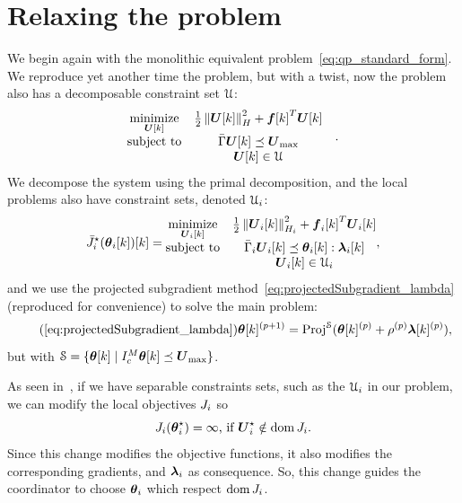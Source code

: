 \documentclass[../main.tex]{subfiles}
\begin{document}
\section{Relaxing the problem}\label{sec:not-so-scarce}
We begin again with the monolithic \mpc{} equivalent problem~\eqref{eq:qp_standard_form}.
We reproduce yet another time the problem, but with a twist, now the problem also has a decomposable constraint set $\mathcal{U}$:
\begin{equation}
  \label{eq:qp_standard_form_again_set_constraint}
  \begin{aligned}
    \begin{matrix}
      \mathop{\textrm{minimize}}\limits_{\boldsymbol{U}[k]} &
                                      \frac{1}{2}\left\lVert\boldsymbol{U}[k]\right\rVert^{2}_{H} + {\boldsymbol{f}[k]}^{T}\boldsymbol{U}[k] &\\
      \mathrm{subject~ to} & \bar{\Gamma}\boldsymbol{U}[k]\preceq {\boldsymbol{U}}_{\text{max}} \\
                                    & \boldsymbol{U}[k]\in \mathcal{U}
    \end{matrix}
  \end{aligned}.
\end{equation}
We decompose the system using the primal decomposition, and the local problems also have constraint sets, denoted $\mathcal{U}_{i}$:
\begin{equation}
  \label{eq:DOP_local_set_constraint}
  \eqoptobji(\thetaik)[k]=
  \begin{matrix}
    \minimize\limits_{\vec{U}_{i}[k]}&\frac{1}{2}\norm{\vec{U}_{i}[k]}^{2}_{H_{i}} + {\vec{f}_{i}[k]}^{T}\vec{U}_{i}[k]\\
    \mathrm{subject~ to} & \bar{\Gamma}_{i}\vec{U}_{i}[k] \preceq \thetaik:\lambdaik\\
                                     & \vec{U}_{i}[k]\in \set{U}_{i}
  \end{matrix},
\end{equation}
and we use the projected subgradient method~\eqref{eq:projectedSubgradient_lambda} (reproduced for convenience) to solve the main problem:
\begin{equation}
  \label{eq:projectedSubgradient_lambda_reprise}
  \tag{\ref*{eq:projectedSubgradient_lambda}}
  \vec{\theta}[k]\pplusone=\Proj^{\set{S}}(\vec{\theta}[k]\p+\rho\p\vec{\lambda}[k]\p),
\end{equation}
but with ${\mathcal{S} = \{\boldsymbol{\theta}[k]\mid I_{c}^{M}\boldsymbol{\theta}[k]\preceq \boldsymbol{U}_{\max}\}}$.
\begin{remark}
  As seen in~\cite{BoydEtAl2015}, if we have separable constraints sets, such as the $\mathcal{U}_{i}$ in our problem, we can modify the local objectives $J_{i}$ so \begin{equation*}
    J_{i}(\boldsymbol{\theta}_i^{\star})=\infty\text{, if }\boldsymbol{U}_{i}^{\star}\notin\operatorname{dom}{J_{i}}.
  \end{equation*}
  Since this change modifies the objective functions, it also modifies the corresponding gradients, and $\boldsymbol{\lambda}_i$ as consequence.
  So, this change guides the coordinator to choose $\boldsymbol{\theta}_i$ which respect $\operatorname{dom}{J_{i}}$.
\end{remark}
\end{document}
